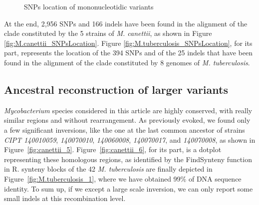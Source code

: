 \documentclass[runningheads,a4paper]{llncs}
\begin{document}
\begin{figure}[!htb]
\begin{minipage}{.5\linewidth}
\centering
{}
\end{minipage}%
\begin{minipage}{.5\linewidth}
\centering
{}
\end{minipage}\par\medskip
\centering
\caption{SNPs location of mononucleotidic variants}
\label{fig:SNPsLocation}
\end{figure}


At the end, 2,956 SNPs and 166 indels have been found in the alignment of the clade constituted by the 5 strains of \textit{M. canettii}, as shown in Figure \ref{fig:M.canettii_SNPsLocation}. Figure \ref{fig:M.tuberculosis_SNPsLocation}, for its part, represents the location of the 394 SNPs and of the 25 indels that have been found in the alignment of the clade constituted by 8 genomes of \textit{M. tuberculosis}. 




\subsection{Ancestral reconstruction of larger variants}




\textit{Mycobacterium} species considered in this article are highly conserved, with really similar regions and without rearrangement. 
As previously evoked, we found only a few significant inversions, like the one at the last common ancestor of strains \textit{CIPT 140010059}, \textit{140070010}, 
\textit{140060008}, \textit{140070017}, and \textit{140070008}, as shown in Figure~\ref{fig:canettii_5}.
Figure~\ref{fig:canettii_6}, for its part, is a dotplot representing these homologous regions, as identified by the FindSynteny function in R. synteny blocks of the 42 \textit{M. tuberculosis} are finally depicted in Figure~\ref{fig:M.tuberculosis_1}, where we have obtained 99\% of DNA sequence identity.
To sum up, if we except a large scale inversion, we can only report some small indels at this recombination level.
\end{document}
